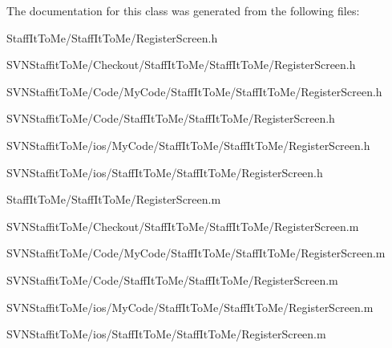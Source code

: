 \-The documentation for this class was generated from the following files\-:\begin{DoxyCompactItemize}
\item 
\-Staff\-It\-To\-Me/\-Staff\-It\-To\-Me/\-Register\-Screen.\-h\item 
\-S\-V\-N\-Staffit\-To\-Me/\-Checkout/\-Staff\-It\-To\-Me/\-Staff\-It\-To\-Me/\-Register\-Screen.\-h\item 
\-S\-V\-N\-Staffit\-To\-Me/\-Code/\-My\-Code/\-Staff\-It\-To\-Me/\-Staff\-It\-To\-Me/\-Register\-Screen.\-h\item 
\-S\-V\-N\-Staffit\-To\-Me/\-Code/\-Staff\-It\-To\-Me/\-Staff\-It\-To\-Me/\-Register\-Screen.\-h\item 
\-S\-V\-N\-Staffit\-To\-Me/ios/\-My\-Code/\-Staff\-It\-To\-Me/\-Staff\-It\-To\-Me/\-Register\-Screen.\-h\item 
\-S\-V\-N\-Staffit\-To\-Me/ios/\-Staff\-It\-To\-Me/\-Staff\-It\-To\-Me/\-Register\-Screen.\-h\item 
\-Staff\-It\-To\-Me/\-Staff\-It\-To\-Me/\-Register\-Screen.\-m\item 
\-S\-V\-N\-Staffit\-To\-Me/\-Checkout/\-Staff\-It\-To\-Me/\-Staff\-It\-To\-Me/\-Register\-Screen.\-m\item 
\-S\-V\-N\-Staffit\-To\-Me/\-Code/\-My\-Code/\-Staff\-It\-To\-Me/\-Staff\-It\-To\-Me/\-Register\-Screen.\-m\item 
\-S\-V\-N\-Staffit\-To\-Me/\-Code/\-Staff\-It\-To\-Me/\-Staff\-It\-To\-Me/\-Register\-Screen.\-m\item 
\-S\-V\-N\-Staffit\-To\-Me/ios/\-My\-Code/\-Staff\-It\-To\-Me/\-Staff\-It\-To\-Me/\-Register\-Screen.\-m\item 
\-S\-V\-N\-Staffit\-To\-Me/ios/\-Staff\-It\-To\-Me/\-Staff\-It\-To\-Me/\-Register\-Screen.\-m\end{DoxyCompactItemize}
